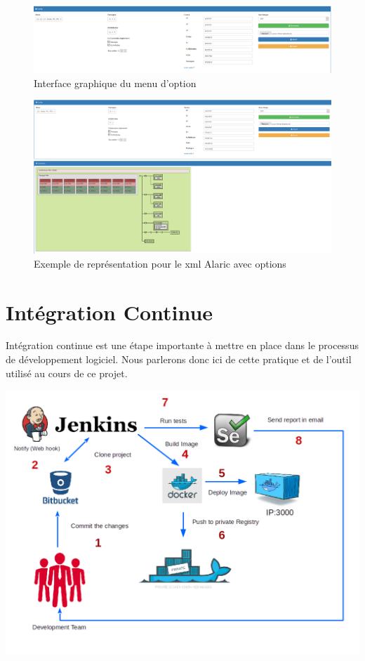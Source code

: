 \documentclass [a4paper,11pt]{article}
\begin{document}
\begin{itemize}
\begin{figure}[!h]
\centering
\includegraphics[scale=0.3]{img/filtre.png}
\caption[Résultats]{ Interface graphique du menu d'option }
\end{figure}

\begin{figure}[!h]
\centering
\includegraphics[scale=0.3]{img/alaric_modif.png}
\caption[Résultats]{Exemple de représentation pour le xml Alaric avec options}
\end{figure}

\end{itemize}

\newpage

\section{Intégration Continue}

Intégration continue est une étape importante à mettre en place dans le processus de développement logiciel. Nous parlerons donc ici de cette pratique et de l'outil utilisé au cours de ce projet.

\begin{center}
\includegraphics[scale=0.5]{img/ci.png}
\end{center}
\end{document}
